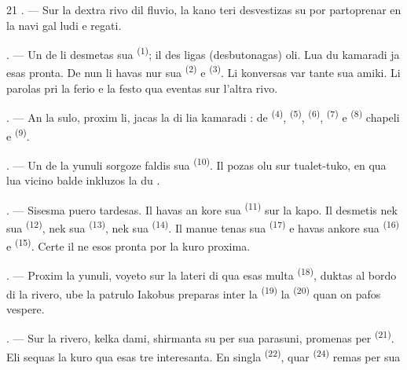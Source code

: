 \begin{VUpage}[23]{21}
. --- Sur la dextra rivo dil fluvio, la kano\cc
teri desvestizas su por partoprenar en la navi\cc
gal ludi e regati.

. --- Un de li desmetas sua  \textsuperscript{(1)}; il des\cc
ligas (desbutonagas) oli. Lua du kamaradi ja\nl
esas pronta. De nun li havas nur sua \nl
{} \textsuperscript{(2)} e  \textsuperscript{(3)}. Li konversas var\cc
tante sua amiki. Li parolas pri la ferio e la\nl
festo qua eventas sur l'altra rivo.

. --- An la sulo, proxim li, jacas la  di\nl
lia kamaradi :  de  \textsuperscript{(4)},  \textsuperscript{(5)}, \cc
{} \textsuperscript{(6)},  \textsuperscript{(7)} e  \textsuperscript{(8)} chapeli e  \textsuperscript{(9)}.

. --- Un de la yunuli sorgoze faldis sua\nl
{} \textsuperscript{(10)}. Il pozas olu sur tualet-tuko, en qua\nl
lua vicino balde inkluzos la du .

. --- Sisesma puero tardesas. Il havas an\cc
kore sua  \textsuperscript{(11)} sur la kapo. Il desmetis\nl
nek sua  \textsuperscript{(12)}, nek sua  \textsuperscript{(13)}, nek\nl
sua  \textsuperscript{(14)}. Il manue tenas sua  \textsuperscript{(17)}\nl
e havas ankore sua  \textsuperscript{(16)} e  \textsuperscript{(15)}.\nl
Certe il ne esos pronta por la kuro proxima.

. --- Proxim la yunuli, voyeto sur la lateri\nl
di qua esas multa  \textsuperscript{(18)}, duktas al bordo\nl
di la rivero, ube la patrulo Iakobus preparas\nl
inter la  \textsuperscript{(19)} la  \textsuperscript{(20)} quan on pafos\nl
vespere.

\VUsaut{4.4mm}
\VUsaut{3.4mm}

. --- Sur la rivero, kelka dami, shirmanta\nl
su per sua parasuni, promenas per  \textsuperscript{(21)}.\nl
Eli sequas la kuro qua esas tre interesanta. En\nl
singla  \textsuperscript{(22)}, quar  \textsuperscript{(24)} remas per sua
\parplein
\end{VUpage}

